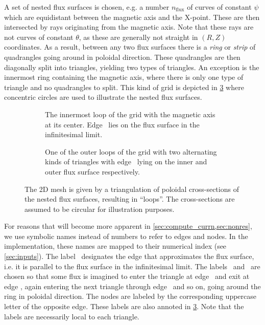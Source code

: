 A set of nested flux surfaces is chosen, e.g. a number $n_{\text{flux}}$ of curves of constant $\psi$ which are equidistant between the magnetic axis and the X-point. These are then intersected by rays originating from the magnetic axis. Note that these rays are not curves of constant $\theta$, as these are generally not straight in $(R, Z)$ coordinates. As a result, between any two flux surfaces there is a \emph{ring} or \emph{strip} of quadrangles going around in poloidal direction. These quadrangles are then diagonally split into triangles, yielding two types of triangles. An exception is the innermost ring containing the magnetic axis, where there is only one type of triangle and no quadrangles to split. This kind of grid is depicted in \cref{fig:grid} where concentric circles are used to illustrate the nested flux surfaces.
\begin{figure}[bth]
  \centering
  \begin{subfigure}[b]{0.33\textwidth}
    \centering
    
    \caption{The innermost loop of the grid with the magnetic axis at its center. Edge \fs\ lies on the flux surface in the infinitesimal limit.}
    \label{fig:grid0}
  \end{subfigure}
  \quad
  \begin{subfigure}[b]{0.5\textwidth}
    \centering
    
    \caption{One of the outer loops of the grid with two alternating kinds of triangles with edge \fs\ lying on the inner and outer flux surface respectively.}
    \label{fig:grid1}
  \end{subfigure}
  \caption{The 2D mesh is given by a triangulation of poloidal cross-sections of the nested flux surfaces, resulting in \enquote{loops}. The cross-sections are assumed to be circular for illustration purposes.}
  \label{fig:grid}
\end{figure}

For reasons that will become more apparent in \cref{sec:compute_currn,sec:nonres}, we use symbolic names instead of numbers to refer to edges and nodes. In the implementation, these names are mapped to their numerical index (see \cref{sec:inputs}). The label \fs\ designates the edge that approximates the flux surface, i.e. it is parallel to the flux surface in the infinitesimal limit. The labels \inw\ and \out\ are chosen so that some flux is imagined to enter the triangle at edge \inw\ and exit at edge \out, again entering the next triangle through edge \inw\ and so on, going around the ring in poloidal direction. The nodes are labeled by the corresponding uppercase letter of the opposite edge. These labels are also annoted in \cref{fig:grid}. Note that the labels are necessarily local to each triangle.

